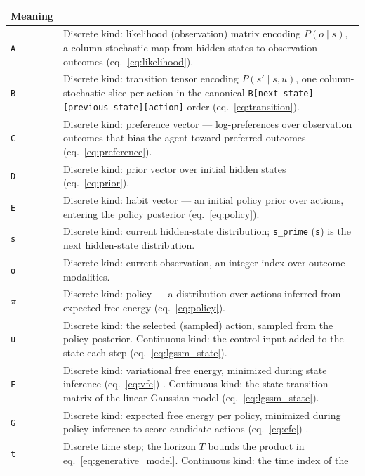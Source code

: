 \documentclass[
  english,
  9pt,
]{extarticle}
\begin{document}
\begin{longtable}[]{@{}
  >{\raggedright\arraybackslash}p{}
  >{\raggedright\arraybackslash}p{}@{}}
\begin{minipage}[b]{\linewidth}
M\allowbreak{}e\allowbreak{}a\allowbreak{}n\allowbreak{}i\allowbreak{}n\allowbreak{}g
\end{minipage} \\
\midrule\noalign{}
\endhead
\bottomrule\noalign{}
\endlastfoot
\texttt{A} & Discrete kind: likelihood (observation) matrix encoding
\(P(o \mid s)\), a column-stochastic map from hidden states to
observation outcomes (eq.~\ref{eq:likelihood}). \\
\texttt{B} & Discrete kind: transition tensor encoding
\(P(s' \mid s, u)\), one column-stochastic slice per action in the
canonical \texttt{B{[}next\_state{]}{[}previous\_state{]}{[}action{]}}
order (eq.~\ref{eq:transition}). \\
\texttt{C} & Discrete kind: preference vector --- log-preferences over
observation outcomes that bias the agent toward preferred outcomes
(eq.~\ref{eq:preference}). \\
\texttt{D} & Discrete kind: prior vector over initial hidden states
(eq.~\ref{eq:prior}). \\
\texttt{E} & Discrete kind: habit vector --- an initial policy prior
over actions, entering the policy posterior (eq.~\ref{eq:policy}). \\
\texttt{s} & Discrete kind: current hidden-state distribution;
\texttt{s\_prime} (\texttt{s\textquotesingle{}}) is the next
hidden-state distribution. \\
\texttt{o} & Discrete kind: current observation, an integer index over
outcome modalities. \\
\texttt{\texorpdfstring{\ensuremath{\pi}}{pi}} & Discrete kind: policy --- a distribution over actions
inferred from expected free energy (eq.~\ref{eq:policy}). \\
\texttt{u} & Discrete kind: the selected (sampled) action, sampled from
the policy posterior. Continuous kind: the control input added to the
state each step (eq.~\ref{eq:lgssm_state}). \\
\texttt{F} & Discrete kind: variational free energy, minimized during
state inference (eq.~\ref{eq:vfe}) \citep{friston2010}. Continuous kind:
the state-transition matrix of the linear-Gaussian model
(eq.~\ref{eq:lgssm_state}). \\
\texttt{G} & Discrete kind: expected free energy per policy, minimized
during policy inference to score candidate actions (eq.~\ref{eq:efe})
\citep{dacosta2020}. \\
\texttt{t} & Discrete time step; the horizon \(T\) bounds the product in
eq.~\ref{eq:generative_model}. Continuous kind: the time index of the

\end{longtable}
\end{document}

